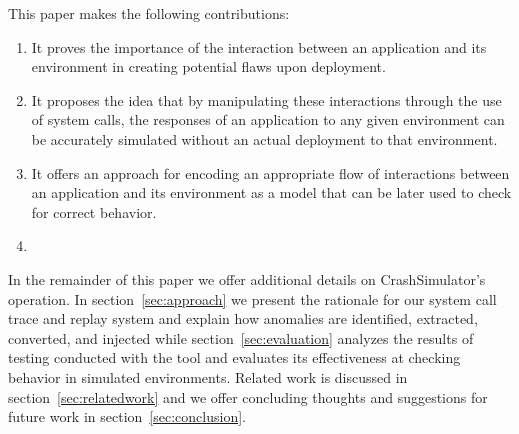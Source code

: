 This paper makes the following contributions:

\begin{enumerate}
\item{It proves the importance of the interaction between an application and
    its environment in creating potential flaws upon deployment.}
\item{It proposes the idea that by manipulating these interactions through
    the use of system calls, the responses of an application to any given
    environment can be accurately simulated without an actual deployment to
    that environment.}
\item{It offers an approach for encoding an appropriate flow of
    interactions between an application and its environment as a model that
    can be later used to check for correct behavior.}
\item {}
\end{enumerate}

In the remainder of this paper we
offer additional details on CrashSimulator's operation.
In section~\ref{sec:approach} we present the rationale for our system call trace
and replay system and explain how anomalies are identified, extracted,
converted, and injected while section~\ref{sec:evaluation} analyzes the results
of testing conducted with the tool and evaluates its effectiveness at checking
behavior in simulated environments.  Related work is discussed in
section~\ref{sec:relatedwork} and we offer concluding thoughts and suggestions
for future work in section~\ref{sec:conclusion}.


